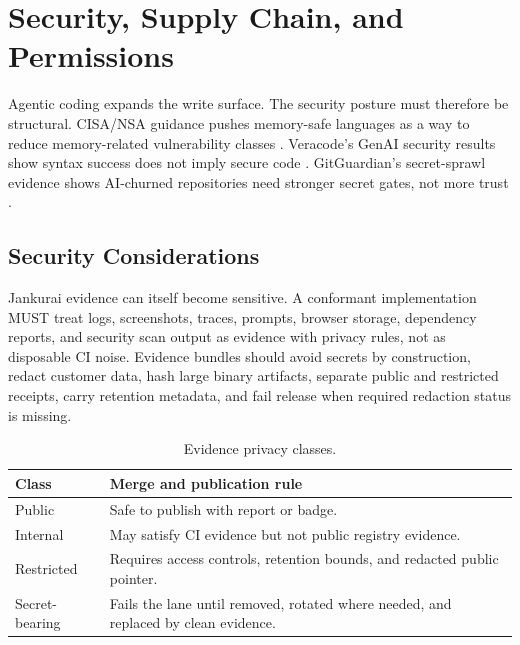 \section{Security, Supply Chain, and Permissions}

Agentic coding expands the write surface. The security posture must therefore be structural. CISA/NSA guidance pushes memory-safe languages as a way to reduce memory-related vulnerability classes \cite{cisaMemorySafeLanguages2025}. Veracode's GenAI security results show syntax success does not imply secure code \cite{veracodeGenaiCodeSecurity2025}. GitGuardian's secret-sprawl evidence shows AI-churned repositories need stronger secret gates, not more trust \cite{gitguardianSecretsSprawl2026}.

\subsection{Security Considerations}

Jankurai evidence can itself become sensitive. A conformant implementation MUST treat logs, screenshots, traces, prompts, browser storage, dependency reports, and security scan output as evidence with privacy rules, not as disposable CI noise. Evidence bundles should avoid secrets by construction, redact customer data, hash large binary artifacts, separate public and restricted receipts, carry retention metadata, and fail release when required redaction status is missing.

\begin{table}[t]
\caption{Evidence privacy classes.}
\label{tab:evidence-privacy}
\centering
\scriptsize
\begin{tabularx}{\columnwidth}{L{0.22\columnwidth} Y}
\toprule
\textbf{Class} & \textbf{Merge and publication rule} \\
\midrule
Public & Safe to publish with report or badge. \\
Internal & May satisfy CI evidence but not public registry evidence. \\
Restricted & Requires access controls, retention bounds, and redacted public pointer. \\
Secret-bearing & Fails the lane until removed, rotated where needed, and replaced by clean evidence. \\
\bottomrule
\end{tabularx}
\end{table}

